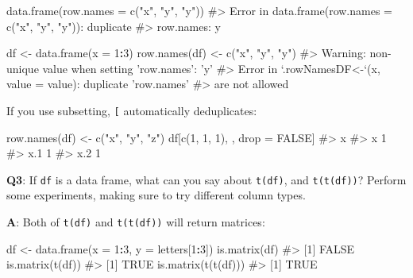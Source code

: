 \documentclass[
]{krantz}
\makeatletter
\newenvironment{Shaded}{\begin{snugshade}}{\end{snugshade}}
\newcommand{\CommentTok}[1]{\textcolor[rgb]{0.56,0.35,0.01}{\textit{#1}}}
\newcommand{\DataTypeTok}[1]{\textcolor[rgb]{0.13,0.29,0.53}{#1}}
\newcommand{\DecValTok}[1]{\textcolor[rgb]{0.00,0.00,0.81}{#1}}
\newcommand{\KeywordTok}[1]{\textcolor[rgb]{0.13,0.29,0.53}{\textbf{#1}}}
\newcommand{\NormalTok}[1]{#1}
\newcommand{\OperatorTok}[1]{\textcolor[rgb]{0.81,0.36,0.00}{\textbf{#1}}}
\newcommand{\OtherTok}[1]{\textcolor[rgb]{0.56,0.35,0.01}{#1}}
\newcommand{\StringTok}[1]{\textcolor[rgb]{0.31,0.60,0.02}{#1}}
\newenvironment{kframe}{%
\medskip{}
\setlength{\fboxsep}{.8em}
 \def\at@end@of@kframe{}%
 \ifinner\ifhmode%
  \def\at@end@of@kframe{\end{minipage}}%
  \begin{minipage}{\columnwidth}%
 \fi\fi%
 \def\FrameCommand##1{\hskip\@totalleftmargin \hskip-\fboxsep
 \colorbox{shadecolor}{##1}\hskip-\fboxsep
     \hskip-\linewidth \hskip-\@totalleftmargin \hskip\columnwidth}%
 \MakeFramed {\advance\hsize-\width
   \@totalleftmargin\z@ \linewidth\hsize
   \@setminipage}}%
 {\par\unskip\endMakeFramed%
 \at@end@of@kframe}
\renewenvironment{Shaded}{\begin{kframe}}{\end{kframe}}
\renewcommand{\KeywordTok} [1]{\textcolor[rgb]{0.00,0.44,0.13}{{#1}}}
\renewcommand{\DataTypeTok}[1]{\textcolor[rgb]{0.56,0.13,0.00}{{#1}}}
\renewcommand{\DecValTok}  [1]{\textcolor[rgb]{0.25,0.63,0.44}{{#1}}}
\renewcommand{\StringTok}  [1]{\textcolor[rgb]{0.25,0.44,0.63}{{#1}}}
\renewcommand{\CommentTok} [1]{\textcolor[rgb]{0.38,0.63,0.69}{{#1}}}
\renewcommand{\OtherTok}   [1]{\textcolor[rgb]{0.00,0.44,0.13}{{#1}}}
\renewcommand{\NormalTok}  [1]{{#1}}
\makeatother
\begin{document}
\begin{Shaded}
\begin{Highlighting}[]
\KeywordTok{data.frame}\NormalTok{(}\DataTypeTok{row.names =} \KeywordTok{c}\NormalTok{(}\StringTok{"x"}\NormalTok{, }\StringTok{"y"}\NormalTok{, }\StringTok{"y"}\NormalTok{))}
\CommentTok{#> Error in data.frame(row.names = c("x", "y", "y")): duplicate}
\CommentTok{#> row.names: y}

\NormalTok{df <-}\StringTok{ }\KeywordTok{data.frame}\NormalTok{(}\DataTypeTok{x =} \DecValTok{1}\OperatorTok{:}\DecValTok{3}\NormalTok{)}
\KeywordTok{row.names}\NormalTok{(df) <-}\StringTok{ }\KeywordTok{c}\NormalTok{(}\StringTok{"x"}\NormalTok{, }\StringTok{"y"}\NormalTok{, }\StringTok{"y"}\NormalTok{)}
\CommentTok{#> Warning: non-unique value when setting 'row.names': 'y'}
\CommentTok{#> Error in `.rowNamesDF<-`(x, value = value): duplicate 'row.names'}
\CommentTok{#> are not allowed}
\end{Highlighting}
\end{Shaded}

If you use subsetting, \texttt{{[}} automatically deduplicates:

\begin{Shaded}
\begin{Highlighting}[]
\KeywordTok{row.names}\NormalTok{(df) <-}\StringTok{ }\KeywordTok{c}\NormalTok{(}\StringTok{"x"}\NormalTok{, }\StringTok{"y"}\NormalTok{, }\StringTok{"z"}\NormalTok{)}
\NormalTok{df[}\KeywordTok{c}\NormalTok{(}\DecValTok{1}\NormalTok{, }\DecValTok{1}\NormalTok{, }\DecValTok{1}\NormalTok{), , drop =}\StringTok{ }\OtherTok{FALSE}\NormalTok{]}
\CommentTok{#>     x}
\CommentTok{#> x   1}
\CommentTok{#> x.1 1}
\CommentTok{#> x.2 1}
\end{Highlighting}
\end{Shaded}

\textbf{{Q3}}: If \texttt{df} is a data frame, what can you say about \texttt{t(df)}, and \texttt{t(t(df))}? Perform some experiments, making sure to try different column types.

\textbf{{A}}: Both of \texttt{t(df)} and \texttt{t(t(df))} will return matrices:

\begin{Shaded}
\begin{Highlighting}[]
\NormalTok{df <-}\StringTok{ }\KeywordTok{data.frame}\NormalTok{(}\DataTypeTok{x =} \DecValTok{1}\OperatorTok{:}\DecValTok{3}\NormalTok{, }\DataTypeTok{y =}\NormalTok{ letters[}\DecValTok{1}\OperatorTok{:}\DecValTok{3}\NormalTok{])}
\KeywordTok{is.matrix}\NormalTok{(df)}
\CommentTok{#> [1] FALSE}
\KeywordTok{is.matrix}\NormalTok{(}\KeywordTok{t}\NormalTok{(df))}
\CommentTok{#> [1] TRUE}
\KeywordTok{is.matrix}\NormalTok{(}\KeywordTok{t}\NormalTok{(}\KeywordTok{t}\NormalTok{(df)))}
\CommentTok{#> [1] TRUE}
\end{Highlighting}
\end{Shaded}
\end{document}
